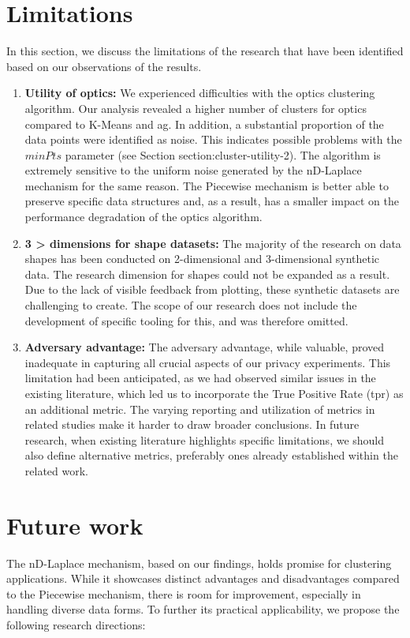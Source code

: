 \section{Limitations}
In this section, we discuss the limitations of the research that have been identified based on our observations of the results.
\begin{enumerate}
    \item \textbf{Utility of \gls{optics}: }
We experienced difficulties with the \gls{optics} clustering algorithm.
Our analysis revealed a higher number of clusters for \gls{optics} compared to K-Means and \gls{ag}. In addition, a substantial proportion of the data points were identified as noise. This indicates possible problems with the $minPts$ parameter (see Section section:cluster-utility-2). The algorithm is extremely sensitive to the uniform noise generated by the nD-Laplace mechanism for the same reason.
The Piecewise mechanism is better able to preserve specific data structures and, as a result, has a smaller impact on the performance degradation of the  \gls{optics} algorithm.
    \item \textbf{3 > dimensions for shape datasets:}
The majority of the research on data shapes has been conducted on 2-dimensional and 3-dimensional synthetic data. The research dimension for shapes could not be expanded as a result.
Due to the lack of visible feedback from plotting, these synthetic datasets are challenging to create. 
The scope of our research does not include the development of specific tooling for this, and was therefore omitted.

\item \textbf{Adversary advantage:} 
The adversary advantage, while valuable, proved inadequate in capturing all crucial aspects of our privacy experiments. This limitation had been anticipated, as we had observed similar issues in the existing literature, which led us to incorporate the True Positive Rate (\gls{tpr}) as an additional metric. The varying reporting and utilization of metrics in related studies make it harder to draw broader conclusions. In future research, when existing literature highlights specific limitations, we should also define alternative metrics, preferably ones already established within the related work.
\end{enumerate} 
\section{Future work}
The nD-Laplace mechanism, based on our findings, holds promise for clustering applications. While it showcases distinct advantages and disadvantages compared to the Piecewise mechanism, there is room for improvement, especially in handling diverse data forms. To further its practical applicability, we propose the following research directions:

